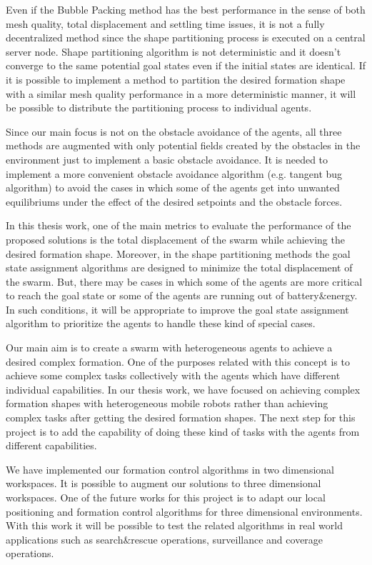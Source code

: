Even if the Bubble Packing method has the best performance in the sense of both mesh quality, total displacement and settling time issues, it is not a fully decentralized method since the shape partitioning process is executed on a central server node. Shape partitioning algorithm is not deterministic and it doesn't converge to the same potential goal states even if the initial states are identical. If it is possible to implement a method to partition the desired formation shape with a similar mesh quality performance in a more deterministic manner, it will be possible to distribute the partitioning process to individual agents. 
    
Since our main focus is not on the obstacle avoidance of the agents, all three methods are augmented with only potential fields created by the obstacles in the environment just to implement a basic obstacle avoidance. It is needed to implement a more convenient obstacle avoidance algorithm (e.g. tangent bug algorithm) to avoid the cases in which some of the agents get into unwanted equilibriums under the effect of the desired setpoints and the obstacle forces.
    
In this thesis work, one of the main metrics to evaluate the performance of the proposed solutions is the total displacement of the swarm while achieving the desired formation shape. Moreover, in the shape partitioning methods the goal state assignment algorithms are designed to minimize the total displacement of the swarm. But, there may be cases in which some of the agents are more critical to reach the goal state or some of the agents are running out of battery$\&$energy. In such conditions, it will be appropriate to improve the goal state assignment algorithm to prioritize the agents to handle these kind of special cases. 
    
Our main aim is to create a swarm with heterogeneous agents to achieve a desired complex formation. One of the purposes related with this concept is to achieve some complex tasks collectively with the agents which have different individual capabilities. In our thesis work, we have focused on achieving complex formation shapes with heterogeneous mobile robots rather than achieving complex tasks after getting the desired formation shapes. The next step for this project is to add the capability of doing these kind of tasks with the agents from different capabilities.

We have implemented our formation control algorithms in two dimensional workspaces. It is possible to augment our solutions to three dimensional workspaces. One of the future works for this project is to adapt our local positioning and formation control algorithms for three dimensional environments. With this work it will be possible to test the related algorithms in real world applications such as search$\&$rescue operations, surveillance and coverage operations.
		
		
		
		
		
		
		
		
		
		
		
		
		
		
		
		